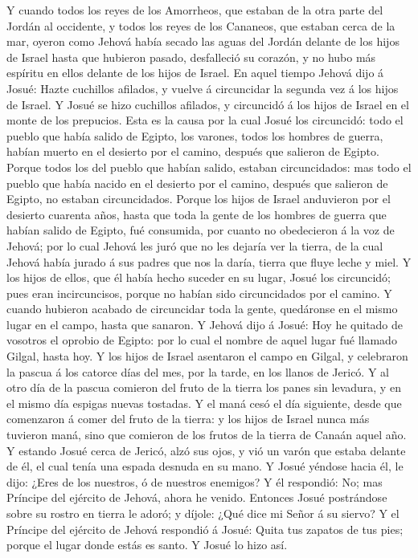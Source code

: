  Y cuando todos los reyes de los Amorrheos, que estaban de
la otra parte del Jordán al occidente, y todos los reyes de los
Cananeos, que estaban cerca de la mar, oyeron como Jehová había secado
las aguas del Jordán delante de los hijos de Israel hasta que hubieron
pasado, desfalleció su corazón, y no hubo más espíritu en ellos delante
de los hijos de Israel.  En aquel tiempo Jehová dijo á
Josué: Hazte cuchillos afilados, y vuelve á circuncidar la segunda vez á
los hijos de Israel.  Y Josué se hizo cuchillos afilados,
y circuncidó á los hijos de Israel en el monte de los prepucios.
 Esta es la causa por la cual Josué los circuncidó: todo
el pueblo que había salido de Egipto, los varones, todos los hombres de
guerra, habían muerto en el desierto por el camino, después que salieron
de Egipto.  Porque todos los del pueblo que habían salido,
estaban circuncidados: mas todo el pueblo que había nacido en el
desierto por el camino, después que salieron de Egipto, no estaban
circuncidados.  Porque los hijos de Israel anduvieron por
el desierto cuarenta años, hasta que toda la gente de los hombres de
guerra que habían salido de Egipto, fué consumida, por cuanto no
obedecieron á la voz de Jehová; por lo cual Jehová les juró que no les
dejaría ver la tierra, de la cual Jehová había jurado á sus padres que
nos la daría, tierra que fluye leche y miel.  Y los hijos
de ellos, que él había hecho suceder en su lugar, Josué los circuncidó;
pues eran incircuncisos, porque no habían sido circuncidados por el
camino.  Y cuando hubieron acabado de circuncidar toda la
gente, quedáronse en el mismo lugar en el campo, hasta que sanaron.
 Y Jehová dijo á Josué: Hoy he quitado de vosotros el
oprobio de Egipto: por lo cual el nombre de aquel lugar fué llamado
Gilgal, hasta hoy.  Y los hijos de Israel asentaron el
campo en Gilgal, y celebraron la pascua á los catorce días del mes, por
la tarde, en los llanos de Jericó.  Y al otro día de la
pascua comieron del fruto de la tierra los panes sin levadura, y en el
mismo día espigas nuevas tostadas.  Y el maná cesó el día
siguiente, desde que comenzaron á comer del fruto de la tierra: y los
hijos de Israel nunca más tuvieron maná, sino que comieron de los frutos
de la tierra de Canaán aquel año.  Y estando Josué cerca
de Jericó, alzó sus ojos, y vió un varón que estaba delante de él, el
cual tenía una espada desnuda en su mano. Y Josué yéndose hacia él, le
dijo: ¿Eres de los nuestros, ó de nuestros enemigos?  Y
él respondió: No; mas Príncipe del ejército de Jehová, ahora he venido.
Entonces Josué postrándose sobre su rostro en tierra le adoró; y díjole:
¿Qué dice mi Señor á su siervo?  Y el Príncipe del
ejército de Jehová respondió á Josué: Quita tus zapatos de tus pies;
porque el lugar donde estás es santo. Y Josué lo hizo así.

